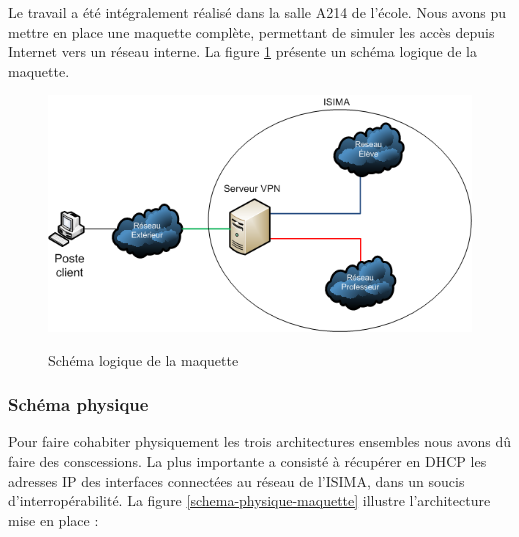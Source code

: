 Le travail a été intégralement réalisé dans la salle A214 de l'école. Nous avons pu mettre en place une maquette complète, permettant de simuler les accès depuis Internet vers un réseau interne. La figure \ref{schema-logique-maquette} présente un schéma logique de la maquette.

\begin{figure}[H]
	\begin{center}
 		\includegraphics[width=\textwidth]{partie_1/images/archi_logique.png}\\
	\end{center}
	\caption{Schéma logique de la maquette}
	\label{schema-logique-maquette}
\end{figure}

\subsubsection{Schéma physique}

Pour faire cohabiter physiquement les trois architectures ensembles nous avons dû faire des conscessions. La plus importante a consisté à récupérer en DHCP les adresses IP des interfaces connectées au réseau de l'ISIMA, dans un soucis d'interropérabilité. La figure \ref{schema-physique-maquette} illustre l'architecture mise en place :

